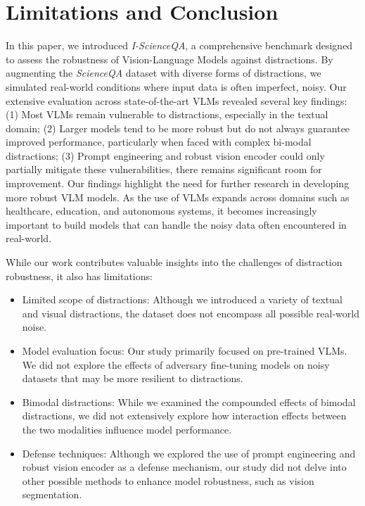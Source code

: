 \section{Limitations and Conclusion}
\label{sec:limitations_and_conclusion}


In this paper, we introduced \emph{I-ScienceQA}, a comprehensive benchmark designed to assess the robustness of Vision-Language Models against distractions. By augmenting the \emph{ScienceQA} dataset with diverse forms of distractions, we simulated real-world conditions where input data is often imperfect, noisy. Our extensive evaluation across state-of-the-art VLMs revealed several key findings: (1) Most VLMs remain vulnerable to distractions, especially in the textual domain; (2) Larger models tend to be more robust but do not always guarantee improved performance, particularly when faced with complex bi-modal distractions; (3) Prompt engineering and robust vision encoder could only partially mitigate these vulnerabilities, there remains significant room for improvement. Our findings highlight the need for further research in developing more robust VLM models. As the use of VLMs expands across domains such as healthcare, education, and autonomous systems, it becomes increasingly important to build models that can handle the noisy data often encountered in real-world.

While our work contributes valuable insights into the challenges of distraction robustness, it also has limitations:

\begin{itemize}[leftmargin=2em] \setlength\itemsep{0em} \item Limited scope of distractions: Although we introduced a variety of textual and visual distractions, the dataset does not encompass all possible real-world noise. 

\item Model evaluation focus: Our study primarily focused on pre-trained VLMs. We did not explore the effects of adversary fine-tuning models on noisy datasets that may be more resilient to distractions.

\item Bimodal distractions: While we examined the compounded effects of bimodal distractions, we did not extensively explore how interaction effects between the two modalities influence model performance. 


\item Defense techniques: Although we explored the use of prompt engineering and robust vision encoder as a defense mechanism, our study did not delve into other possible methods to enhance model robustness, such as vision segmentation\cite{lai2023lisa}. 
\end{itemize}

